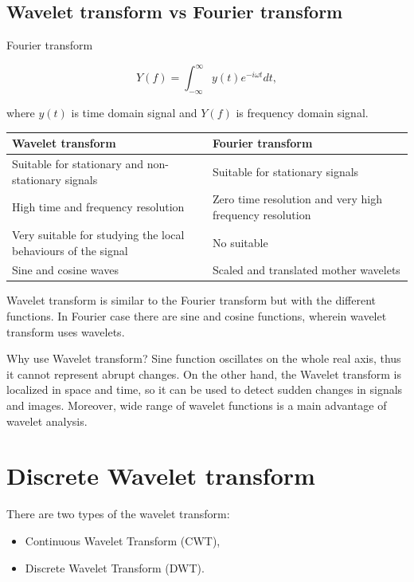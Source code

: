 \subsection{Wavelet transform vs Fourier transform}

\begin{defn}
Fourier transform

\begin{equation}
Y(f)=\int_{-\infty}^{\infty} y(t) e^{-i\omega t} dt,
\end{equation}

where $y(t)$ is time domain signal and $Y(f)$ is frequency domain signal.
\end{defn}

\begin{table}[]
\centering
\begin{tabular}{|p{0.5\linewidth}|p{0.5\linewidth}|}
\toprule
\textbf{ Wavelet transform} & \textbf{Fourier transform}
\\ \midrule
Suitable for stationary and non-stationary signals 
& Suitable for stationary signals 
\\ \midrule
High time and frequency resolution
& Zero time resolution and very high frequency resolution     
\\ \midrule
Very suitable for studying the local behaviours of the signal
& No suitable  
\\ \midrule
Sine and cosine waves
& Scaled and translated mother wavelets
\\ \bottomrule
\end{tabular}
\end{table}

Wavelet transform is similar to the Fourier transform but with the different functions. In Fourier case there are sine and cosine functions, wherein wavelet transform uses wavelets.

Why use Wavelet transform?
Sine function oscillates on the whole real axis, thus it cannot represent abrupt changes. On the other hand, the Wavelet transform is localized in space and time, so it can be used to detect sudden changes in signals and images. Moreover, wide range of wavelet functions is a main advantage of wavelet analysis.

\section{Discrete Wavelet transform}
There are two types of the wavelet transform:
\begin{itemize}
\item Continuous Wavelet Transform (CWT),
\item Discrete Wavelet Transform (DWT).
\end{itemize}

